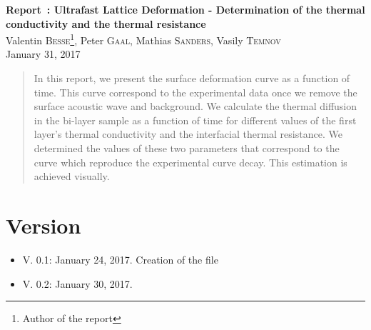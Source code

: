 \documentclass[12pt,a4paper,fleqn]{article}
\begin{document}
	
	
\begin{center}
	{\bf\Large Report~\MakeUppercase{}: Ultrafast Lattice Deformation - Determination of the thermal conductivity and the thermal resistance}\\
	\vspace{0.4cm}
	{\large Valentin \textsc{Besse}\footnote{Author of the report}, Peter \textsc{Gaal}, Mathias \textsc{Sanders}, Vasily \textsc{Temnov}}\\
	\vspace{0.6cm}
	{\large January 31, 2017}
\end{center}
\vspace{0.1cm}

\begin{abstract}
	{\noindent In this report, we present the surface deformation curve as a function of time.
	This curve correspond to the experimental data once we remove the surface acoustic wave and background.
	We calculate the thermal diffusion in the bi-layer sample as a function of time for different values of the first layer's thermal conductivity and the interfacial thermal resistance.
	We determined the values of these two parameters that correspond to the curve which reproduce the experimental curve decay.
	This estimation is achieved visually.}
\end{abstract}

\section{Version}

\begin{itemize}
	\item V. 0.1: January 24, 2017. Creation of the file
	\item V. 0.2: January 30, 2017.
\end{itemize}
\end{document}

